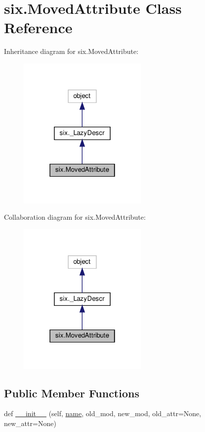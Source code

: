 \hypertarget{classsix_1_1MovedAttribute}{}\section{six.\+Moved\+Attribute Class Reference}
\label{classsix_1_1MovedAttribute}


Inheritance diagram for six.\+Moved\+Attribute\+:
\nopagebreak
\begin{figure}[H]
\begin{center}
\leavevmode
\includegraphics[width=178pt]{classsix_1_1MovedAttribute__inherit__graph}
\end{center}
\end{figure}


Collaboration diagram for six.\+Moved\+Attribute\+:
\nopagebreak
\begin{figure}[H]
\begin{center}
\leavevmode
\includegraphics[width=178pt]{classsix_1_1MovedAttribute__coll__graph}
\end{center}
\end{figure}
\subsection*{Public Member Functions}
\begin{DoxyCompactItemize}
\item 
def \hyperlink{classsix_1_1MovedAttribute_a1240d0b7627c71d6fff8b21ef22013fa}{\+\_\+\+\_\+init\+\_\+\+\_\+} (self, \hyperlink{classsix_1_1__LazyDescr_ad45b705c0f4b63da8bcd1311527b2591}{name}, old\+\_\+mod, new\+\_\+mod, old\+\_\+attr=None, new\+\_\+attr=None)
\end{DoxyCompactItemize}
